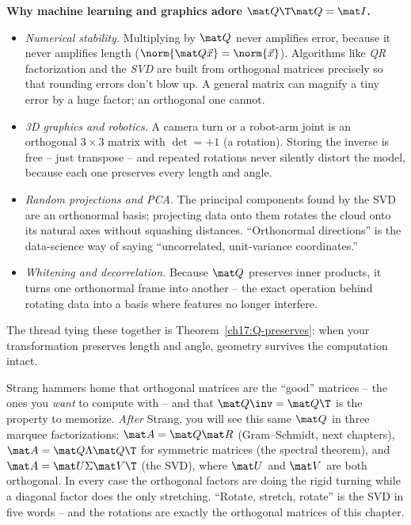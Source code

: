 \begin{applicationbox}
\textbf{Why machine learning and graphics adore $\mat Q\T\mat Q=\mat I$.}
\begin{itemize}
  \item \emph{Numerical stability.} Multiplying by $\mat Q$ never amplifies error, because it
        never amplifies length ($\norm{\mat Q\vec x}=\norm{\vec x}$). Algorithms like \emph{QR}
        factorization and the \emph{SVD} are built from orthogonal matrices precisely so that
        rounding errors don't blow up. A general matrix can magnify a tiny error by a huge factor;
        an orthogonal one cannot.
  \item \emph{3D graphics and robotics.} A camera turn or a robot-arm joint is an orthogonal
        $3\times3$ matrix with $\det=+1$ (a rotation). Storing the inverse is free -- just transpose
        -- and repeated rotations never silently distort the model, because each one preserves
        every length and angle.
  \item \emph{Random projections and PCA.} The principal components found by the SVD are an
        orthonormal basis; projecting data onto them rotates the cloud onto its natural axes
        without squashing distances. ``Orthonormal directions'' is the data-science way of saying
        ``uncorrelated, unit-variance coordinates.''
  \item \emph{Whitening and decorrelation.} Because $\mat Q$ preserves inner products, it turns one
        orthonormal frame into another -- the exact operation behind rotating data into a basis
        where features no longer interfere.
\end{itemize}
The thread tying these together is Theorem~\ref{ch17:Q-preserves}: when your transformation
preserves length and angle, geometry survives the computation intact.
\end{applicationbox}

\begin{strangbox}
Strang hammers home that orthogonal matrices are the ``good'' matrices -- the ones you \emph{want}
to compute with -- and that $\mat Q\inv=\mat Q\T$ is the property to memorize. \emph{After} Strang,
you will see this same $\mat Q$ in three marquee factorizations: $\mat A=\mat Q\mat R$
(Gram--Schmidt, next chapters), $\mat A=\mat Q\Lambda\mat Q\T$ for symmetric matrices (the spectral
theorem), and $\mat A=\mat U\Sigma\mat V\T$ (the SVD), where $\mat U$ and $\mat V$ are both
orthogonal. In every case the orthogonal factors are doing the rigid turning while a diagonal factor
does the only stretching. ``Rotate, stretch, rotate'' is the SVD in five words -- and the rotations
are exactly the orthogonal matrices of this chapter.
\end{strangbox}

